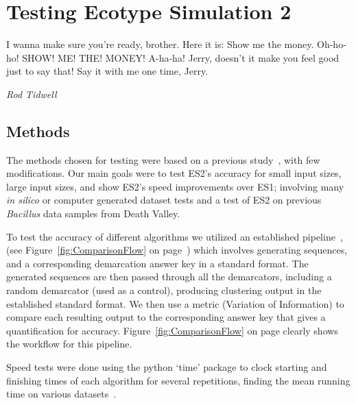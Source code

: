 \gobbletocpage
\chapter{Testing Ecotype Simulation 2}
\restoretocpage

\begin{shadequote}
I wanna make sure you're ready, brother. Here it is: Show me the money. Oh-ho-ho! SHOW! ME! THE! MONEY! A-ha-ha! Jerry, doesn't it make you feel good just to say that! Say it with me one time, Jerry. \par\emph{Rod Tidwell}
\end{shadequote}


\section{Methods}
The methods chosen for testing were based on a previous study~\cite{carlo}, with few modifications.
Our main goals were to test ES2's accuracy for small input sizes, large input sizes, and show ES2's speed improvements over ES1; involving many \emph{in silico} or computer generated dataset tests and a test of ES2 on previous \emph{Bacillus} data samples from Death Valley.

To test the accuracy of different algorithms we utilized an established pipeline~\cite{carlo}, (see Figure~\ref{fig:ComparisonFlow} on page~\pageref{fig:ComparisonFlow}) which involves generating sequences, and a corresponding demarcation answer key in a standard format.
The generated sequences are then passed through all the demarcators, including a random demarcator (used as a control), producing clustering output in the established standard format.
We then use a metric (Variation of Information) to compare each resulting output to the corresponding answer key that gives a quantification for accuracy. Figure~\ref{fig:ComparisonFlow} on page \pageref{fig:ComparisonFlow} clearly shows the workflow for this pipeline.

Speed tests were done using the python `time' package to clock starting and finishing times of each algorithm for several repetitions, finding the mean running time on various datasets~\cite{carlo}.

